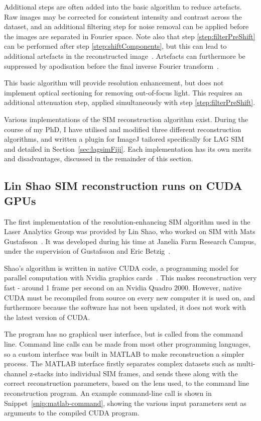 Additional steps are often added into the basic algorithm to reduce artefacts.
Raw images may be corrected for consistent intensity and contrast across the dataset, and an additional filtering step for noise removal can be applied before the images are separated in Fourier space.
Note also that step \ref{step:filterPreShift} can be performed after step \ref{step:shiftComponents}, but this can lead to additional artefacts in the reconstructed image~\cite{gustafsson2008three}.
Artefacts can furthermore be suppressed by apodisation before the final inverse Fourier transform~\cite{gustafsson2008three}.

This basic algorithm will provide resolution enhancement, but does not implement optical sectioning for removing out-of-focus light.
This requires an additional attenuation step, applied simultaneously with step \ref{step:filterPreShift}.

Various implementations of the SIM reconstruction algorithm exist.
During the course of my PhD, I have utilised and modified three different reconstruction algorithms, and written a plugin for ImageJ tailored specifically for LAG SIM and detailed in Section~\ref{sec:lagsimFiji}.
Each implementation has its own merits and disadvantages, discussed in the remainder of this section.

\subsection{Lin Shao SIM reconstruction runs on CUDA GPUs}
The first implementation of the resolution-enhancing SIM algorithm used in the Laser Analytics Group was provided by Lin Shao, who worked on SIM with Mats Gustafsson~\cite{shao2011super}.
It was developed during his time at Janelia Farm Research Campus, under the supervision of Gustafsson and Eric Betzig~\cite{beach2014nonmuscle}.

Shao's algorithm is written in native CUDA code, a programming model for parallel computation with Nvidia graphics cards~\cite{sanders2010cuda}.
This makes reconstruction very fast - around 1 frame per second on an Nvidia Quadro 2000.
However, native CUDA must be recompiled from source on every new computer it is used on, and furthermore because the software has not been updated, it does not work with the latest version of CUDA.

The program has no graphical user interface, but is called from the command line.
Command line calls can be made from most other programming languages, so a custom interface was built in MATLAB to make reconstruction a simpler process.
The MATLAB interface firstly separates complex datasets such as multi-channel z-stacks into individual SIM frames, and sends these along with the correct reconstruction parameters, based on the lens used, to the command line reconstruction program.
An example command-line call is shown in Snippet~\ref{snip:matlab-command}, showing the various input parameters sent as arguments to the compiled CUDA program. 

